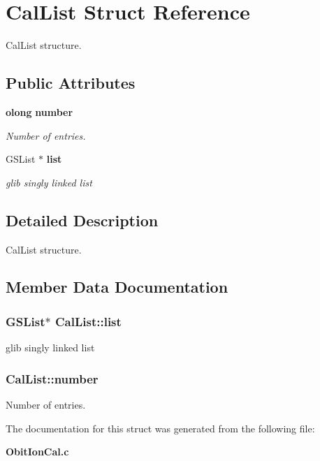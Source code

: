 \section{Cal\-List Struct Reference}
\label{structCalList}
Cal\-List structure.  


\subsection*{Public Attributes}
\begin{CompactItemize}
\item 
{\bf olong} {\bf number}
\begin{CompactList}\small\item\em Number of entries. \item\end{CompactList}\item 
GSList $\ast$ {\bf list}
\begin{CompactList}\small\item\em glib singly linked list \item\end{CompactList}\end{CompactItemize}


\subsection{Detailed Description}
Cal\-List structure. 



\subsection{Member Data Documentation}
\subsubsection{\setlength{\rightskip}{0pt plus 5cm}GSList$\ast$ {\bf Cal\-List::list}}\label{structCalList_o1}


glib singly linked list 

\subsubsection{ {\bf Cal\-List::number}}\label{structCalList_o0}


Number of entries. 



The documentation for this struct was generated from the following file:\begin{CompactItemize}
\item 
{\bf Obit\-Ion\-Cal.c}\end{CompactItemize}
